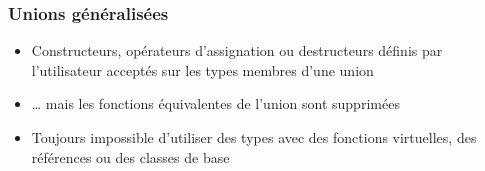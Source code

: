 \documentclass[C++.tex]{subfiles}
\begin{document}
\begin{frame}[fragile]
	\frametitle{Unions généralisées}
	\begin{itemize}
		\item Constructeurs, opérateurs d'assignation ou destructeurs définis par l'utilisateur acceptés sur les types membres d'une union
		\item \ldots{} mais les fonctions équivalentes de l'union sont supprimées


		\item Toujours impossible d'utiliser des types avec des fonctions virtuelles, des références ou des classes de base
	\end{itemize}

\end{frame}
\end{document}
